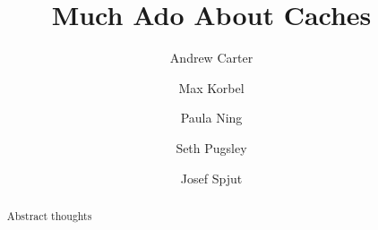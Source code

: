 \documentclass[conference]{IEEEtran}
\begin{document}
\title{Much Ado About Caches}


\author{Andrew Carter \and Max Korbel \and Paula Ning \and Seth Pugsley \and Josef Spjut}

\maketitle

\begin{abstract}
Abstract thoughts
\end{abstract}









%
%
\end{document}
